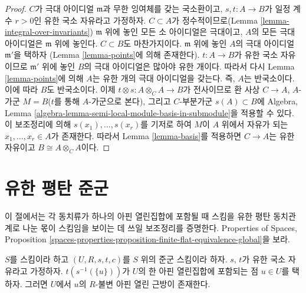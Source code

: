 \begin{proof}
\medskip\noindent
$C$가 극대 아이디얼 $\mathfrak m$과 무한 잉여체를 갖는 국소환이고, $s, t : A \to B$가 일정 계수 $r > 0$인
유한 국소 자유라고 가정하자. $C \subset A$가 정수적이므로(Lemma \ref{lemma-integral-over-invariants})
$\mathfrak m$ 위에 놓인 모든 소 아이디얼은 극대이고, $A$의 모든 극대 아이디얼은 $\mathfrak m$ 위에 놓인다.
$C \subset B$도 마찬가지이다. $\mathfrak m$ 위에 놓인 $A$의 극대 아이디얼 $\mathfrak m'$을 택하자
(Lemma \ref{lemma-points}에 의해 존재한다). $t : A \to B$가 유한 국소 자유이므로 $\mathfrak m'$ 위에 놓인
$B$의 극대 아이디얼은 많아야 유한 개이다. 따라서 다시 Lemma \ref{lemma-points}에 의해 $A$는 유한 개의
극대 아이디얼을 갖는다. 즉, $A$는 반국소이다. 이에 따라 $B$도 반국소이다. 이제
$t \otimes s : A \otimes_C A \to B$가 전사이므로 환 사상 $C \to A$, $A$-가군 $M = B$($t$를 통해
$A$-가군으로 본다), 그리고 $C$-부분가군 $s(A) \subset B$에
Algebra, Lemma \ref{algebra-lemma-semi-local-module-basis-in-submodule}을 적용할 수 있다.
이 보조정리에 의해 $s(x_1), \ldots, s(x_r)$를 기저로 하여 $M$이 $A$ 위에서 자유가 되는
$x_1, \ldots, x_r \in A$가 존재한다. 따라서 Lemma \ref{lemma-basis}를 적용하면 $C \to A$는 유한 자유이고
$B \cong A \otimes_C A$이다.
\end{proof}



\section{유한 평탄 준군}
\label{section-finite-flat-general}

\noindent
이 절에서는 각 동치류가 하나의 아핀 열린집합에 포함될 때 스킴을 유한 평탄 동치관계로 나눈 몫이 스킴임을
보이는 데 쓰일 보조정리를 증명한다. Properties of Spaces,
Proposition \ref{spaces-properties-proposition-finite-flat-equivalence-global}을 보라.

\begin{lemma}
\label{lemma-find-invariant-affine}
$S$를 스킴이라 하고 $(U, R, s, t, c)$를 $S$ 위의 준군 스킴이라 하자. $s$, $t$가 유한 국소 자유라고 가정하자.
$t(s^{-1}(\{u\}))$가 $U$의 한 아핀 열린집합에 포함되는 점 $u \in U$를 택하자.
그러면 $U$에서 $u$의 $R$-불변 아핀 열린 근방이 존재한다.
\end{lemma}


